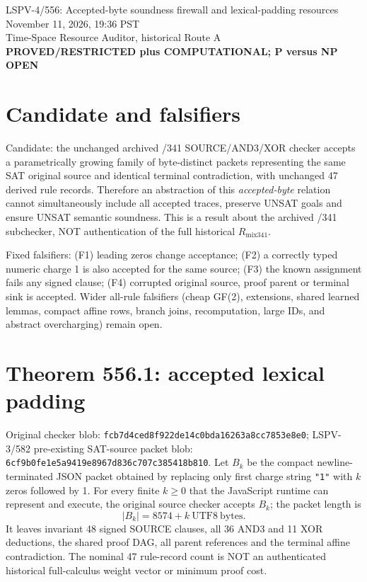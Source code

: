 \documentclass[11pt]{article}
\begin{document}
\begin{center}
{\Large LSPV-4/556: Accepted-byte soundness firewall and lexical-padding resources}\\
November 11, 2026, 19:36 PST\\
Time-Space Resource Auditor, historical Route A\\
\textbf{PROVED/RESTRICTED plus COMPUTATIONAL; P versus NP OPEN}
\end{center}

\section*{Candidate and falsifiers}
Candidate: the unchanged archived /341 SOURCE/AND3/XOR checker accepts a parametrically growing family of byte-distinct packets representing the same SAT original source and identical terminal contradiction, with unchanged 47 derived rule records. Therefore an abstraction of this \emph{accepted-byte} relation cannot simultaneously include all accepted traces, preserve UNSAT goals and ensure UNSAT semantic soundness. This is a result about the archived /341 subchecker, NOT authentication of the full historical $R_{\mathrm{mix341}}$.

Fixed falsifiers: (F1) leading zeros change acceptance; (F2) a correctly typed numeric charge 1 is also accepted for the same source; (F3) the known assignment fails any signed clause; (F4) corrupted original source, proof parent or terminal sink is accepted. Wider all-rule falsifiers (cheap GF(2), extensions, shared learned lemmas, compact affine rows, branch joins, recomputation, large IDs, and abstract overcharging) remain open.

\section*{Theorem 556.1: accepted lexical padding}
Original checker blob: \texttt{fcb7d4ced8f922de14c0bda16263a8cc7853e8e0}; LSPV-3/582 pre-existing SAT-source packet blob: \texttt{6cf9b0fe1e5a9419e8967d836c707c385418b810}. Let $B_k$ be the compact newline-terminated JSON packet obtained by replacing only first charge string \texttt{"1"} with $k$ zeros followed by 1. For every finite $k\ge0$ that the JavaScript runtime can represent and execute, the original source checker accepts $B_k$; the packet length is
\[
\boxed{|B_k|=8574+k\ \mathrm{UTF8\ bytes}.}
\]
It leaves invariant 48 signed SOURCE clauses, all 36 AND3 and 11 XOR deductions, the shared proof DAG, all parent references and the terminal affine contradiction. The nominal 47 rule-record count is NOT an authenticated historical full-calculus weight vector or minimum proof cost.
\end{document}
